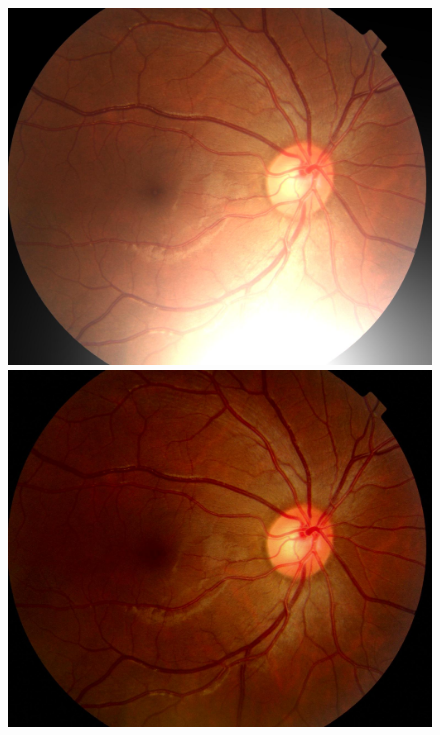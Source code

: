 \documentclass[../main.tex]{subfiles}
\begin{document}
\begin{figure}[htbp]
\begin{minipage}{5cm}
\centering
\includegraphics[width=1\linewidth]{testimage_augmented__10.jpg}
\subcaption{}
\end{minipage}
\begin{minipage}{5cm}
\centering
\includegraphics[width=1\linewidth]{testimage_augmented__9.jpg}
\subcaption{}
\end{minipage}
\begin{minipage}{5cm}
\centering

\end{minipage}
\end{figure}
\end{document}
